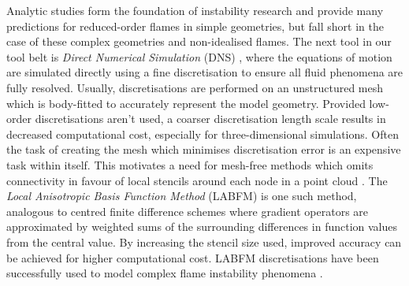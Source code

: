 Analytic studies form the foundation of instability research and provide many predictions for reduced-order flames in simple geometries, but fall short in the case of these complex geometries and non-idealised flames. The next tool in our tool belt is \emph{Direct Numerical Simulation} (DNS) \cite{orszag1970AnalyticalTheoriesTurbulence}, where the equations of motion are simulated directly using a fine discretisation to ensure all fluid phenomena are fully resolved. Usually, discretisations are performed on an unstructured mesh which is body-fitted to accurately represent the model geometry. Provided low-order discretisations aren't used, a coarser discretisation length scale results in decreased computational cost, especially for three-dimensional simulations. Often the task of creating the mesh which minimises discretisation error is an expensive task within itself. This motivates a need for mesh-free methods which omits connectivity in favour of local stencils around each node in a point cloud \cite{garg2018MeshfreeMethodsComprehensive, li2002MeshfreeParticleMethods}. The \emph{Local Anisotropic Basis Function Method} (LABFM) \cite{king2020HighOrderDifference, king2022HighOrderSimulationsIsothermal} is one such method, analogous to centred finite difference schemes where gradient operators are approximated by weighted sums of the surrounding differences in function values from the central value. By increasing the stencil size used, improved accuracy can be achieved for higher computational cost. LABFM discretisations have been successfully used to model complex flame instability phenomena \cite{king2024MeshFreeFrameworkHighOrdera, broadley2025HighorderMeshfreeDirect}.


